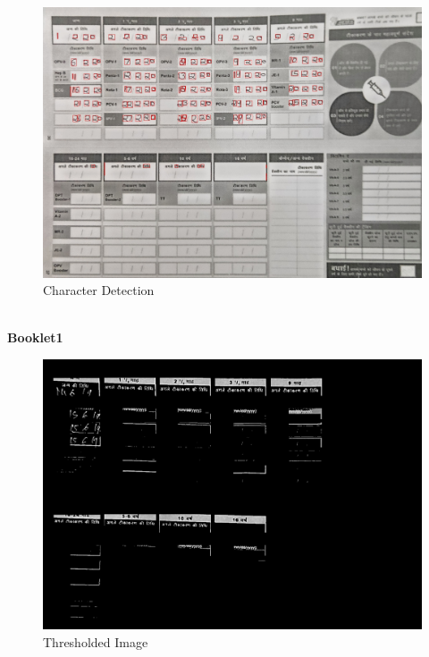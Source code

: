 \documentclass{article}
\begin{document}
    \begin{figure}[!htb]
    \minipage{\textwidth}
    \begin{center}
      \includegraphics[scale=.25]{4/.report/_char/p2.jpg}
      \caption{Character Detection}
    \end{center}
    \endminipage
    \end{figure}
\pagebreak \\
\textbf{Booklet1}
    \begin{figure}[!htb]
    \minipage{\textwidth}
    \begin{center}
      \includegraphics[scale=.25]{4/.report/_thresh/b1.jpg}
      \caption{Thresholded Image}
    \end{center}
    \endminipage
    \end{figure}
\end{document}
